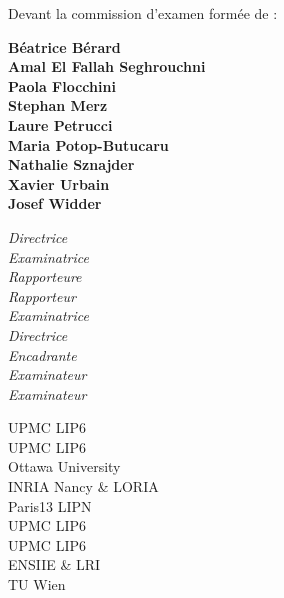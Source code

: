 \begin{titlepage}
\vfill
\begin{center}
\noindent \large
{\normalsize
\begin{flushleft}
\noindent Devant la commission d'examen form\'ee de : \\
\begin{minipage}[t]{0.43\textwidth}
	\bfseries
	Béatrice Bérard\\
	Amal El Fallah Seghrouchni\\
	Paola Flocchini\\
	Stephan Merz\\
	Laure Petrucci\\
	Maria Potop-Butucaru\\
	Nathalie Sznajder\\
	Xavier Urbain\\
	Josef Widder \\
\end{minipage}
\begin{minipage}[t]{0.25\textwidth}
    \itshape
    Directrice\\
    Examinatrice\\
    Rapporteure\\
    Rapporteur\\
    Examinatrice\\
    Directrice\\
    Encadrante\\
    Examinateur\\
    Examinateur
\end{minipage}
\begin{minipage}[t]{0.30\textwidth}
     UPMC LIP6\\
     UPMC LIP6\\
     Ottawa University \\
     INRIA Nancy \& LORIA \\
     Paris13 LIPN\\
     UPMC LIP6\\
     UPMC LIP6\\
      ENSIIE \& LRI\\
     TU Wien
\end{minipage}
\end{flushleft}
}

\end{center}
\end{titlepage}

